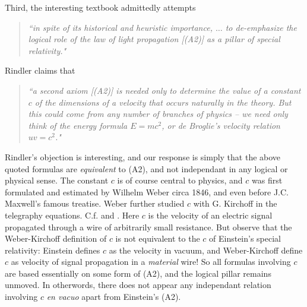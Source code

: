 \documentclass[12pt]{article}
\begin{document}
Third, the interesting textbook \cite[pp.8-10, 21-22]{rindler} admittedly attempts 
\begin{quote}
\emph{``in spite of its historical and heuristic importance, $\ldots$ to de-emphasize the logical role of the law of light propagation [(A2)] as a pillar of special relativity."}
\end{quote}
Rindler claims that
\begin{quote}
\emph{``a second axiom [(A2)] is needed \emph{only} to determine the value of a constant $c$ of the dimensions of a velocity that occurs naturally in the theory. But this could come from any number of branches of physics -- we need only think of the energy formula $E=mc^2$, or de Broglie's velocity relation $u v =c^2$." }
\end{quote}
Rindler's objection is interesting, and our response is simply that the above quoted formulas are \emph{equivalent} to (A2), and not independant in any logical or physical sense. The constant $c$ is of course central to physics, and $c$ was first formulated and estimated by Wilhelm Weber circa 1846, and even before J.C. Maxwell's famous treatise. Weber further studied $c$ with G. Kirchoff in the telegraphy equations. C.f. \cite{assis1999meaning} and \cite{awk}. Here $c$ is the velocity of an electric signal propagated through a wire of arbitrarily small resistance. But observe that the Weber-Kirchoff definition of $c$ is not equivalent to the $c$ of Einstein's special relativity: Einstein defines $c$ as the velocity in vacuum, and Weber-Kirchoff define $c$ as velocity of signal propagation in a \emph{material} wire! So all formulas involving $c$ are based essentially on some form of (A2), and the logical pillar remains unmoved. In otherwords, there does not appear any independant relation involving $c$ \emph{en vacuo} apart from Einstein's (A2). 

\end{document}
